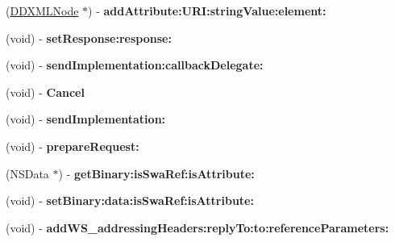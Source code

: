 \begin{DoxyCompactItemize}
\item 
\hypertarget{interface_request_result_handler_a5272aeecd4b9b0d56e537767896412fb}{}(\hyperlink{interface_d_d_x_m_l_node}{D\+D\+X\+M\+L\+Node} $\ast$) -\/ {\bfseries add\+Attribute\+:\+U\+R\+I\+:string\+Value\+:element\+:}\label{interface_request_result_handler_a5272aeecd4b9b0d56e537767896412fb}

\item 
\hypertarget{interface_request_result_handler_a240b55f26bab780ff6d0ba89949665d9}{}(void) -\/ {\bfseries set\+Response\+:response\+:}\label{interface_request_result_handler_a240b55f26bab780ff6d0ba89949665d9}

\item 
\hypertarget{interface_request_result_handler_a08685133d757fa1fd286818cb153ddf7}{}(void) -\/ {\bfseries send\+Implementation\+:callback\+Delegate\+:}\label{interface_request_result_handler_a08685133d757fa1fd286818cb153ddf7}

\item 
\hypertarget{interface_request_result_handler_af76edb2f9b576e56a96d907ba276c270}{}(void) -\/ {\bfseries Cancel}\label{interface_request_result_handler_af76edb2f9b576e56a96d907ba276c270}

\item 
\hypertarget{interface_request_result_handler_a60811bb7c375406817b2bbc672cc416d}{}(void) -\/ {\bfseries send\+Implementation\+:}\label{interface_request_result_handler_a60811bb7c375406817b2bbc672cc416d}

\item 
\hypertarget{interface_request_result_handler_ad0dad6d8b071c298ee660b0038e08c52}{}(void) -\/ {\bfseries prepare\+Request\+:}\label{interface_request_result_handler_ad0dad6d8b071c298ee660b0038e08c52}

\item 
\hypertarget{interface_request_result_handler_a8ae27dcb2853663af68f375c453aebf9}{}(N\+S\+Data $\ast$) -\/ {\bfseries get\+Binary\+:is\+Swa\+Ref\+:is\+Attribute\+:}\label{interface_request_result_handler_a8ae27dcb2853663af68f375c453aebf9}

\item 
\hypertarget{interface_request_result_handler_ae61ab45b788454b335a85a6cbcc7f385}{}(void) -\/ {\bfseries set\+Binary\+:data\+:is\+Swa\+Ref\+:is\+Attribute\+:}\label{interface_request_result_handler_ae61ab45b788454b335a85a6cbcc7f385}

\item 
\hypertarget{interface_request_result_handler_af1b416d387773e0a23d58433fce64f6c}{}(void) -\/ {\bfseries add\+W\+S\+\_\+addressing\+Headers\+:reply\+To\+:to\+:reference\+Parameters\+:}\label{interface_request_result_handler_af1b416d387773e0a23d58433fce64f6c}


\end{DoxyCompactItemize}
